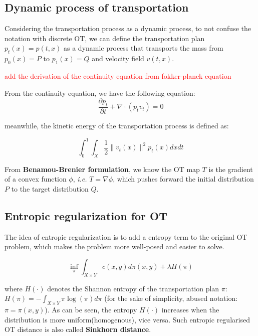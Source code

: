 \documentclass{article}
\begin{document}
\subsection{Dynamic process of transportation}
Considering the transportation process as a dynamic process, to not confuse the notation with discrete OT, we can define the transportation plan $p_{t}(x) = p(t,x)$ as a dynamic process that transports the mass from $p_{0}(x) = P$ to $p_{1}(x) = Q$ and velocity field $v(t,x)$.

\textcolor{red}{add the derivation of the continuity equation from fokker-planck equation}

From the continuity equation, we have the following equation:
\begin{equation}
    \frac{\partial{p_{t}}}{\partial{t}} + \nabla \cdot (p_{t}v_{t}) = 0
\end{equation}

meanwhile, the kinetic energy of the transportation process is defined as:

\begin{equation}
    \int_{0}^{1} \int_{X} \frac{1}{2} \lVert v_{t}(x) \rVert^{2} p_{t}(x) dx dt
\end{equation}

From \textbf{Benamou-Brenier formulation}, we know the OT map $T$ is the gradient of a convex function $\phi$, \emph{i.e.} $T = \nabla \phi$, which pushes forward the initial distribution $P$ to the target distribution $Q$. 

\subsection{Entropic regularization for OT}
The idea of entropic regularization is to add a entropy term to the original OT problem, which makes the problem more well-posed and easier to solve.

\begin{equation}
    \inf_{\pi} \int_{X \times Y} c(x,y) d\pi(x,y) + \lambda H(\pi)
\end{equation}

where $H(\cdot)$ denotes the Shannon entropy of the transportation plan $\pi$: $H(\pi) = -\int_{X \times Y} \pi \log(\pi) d\pi$ (for the sake of simplicity, abused notation: $\pi = \pi(x,y)$). As can be seen, the entropy $H(\cdot)$ increases when the distribution is more uniform(homogenous), vice versa. Such entropic regularised OT distance is also called \textbf{Sinkhorn distance}.
\end{document}
